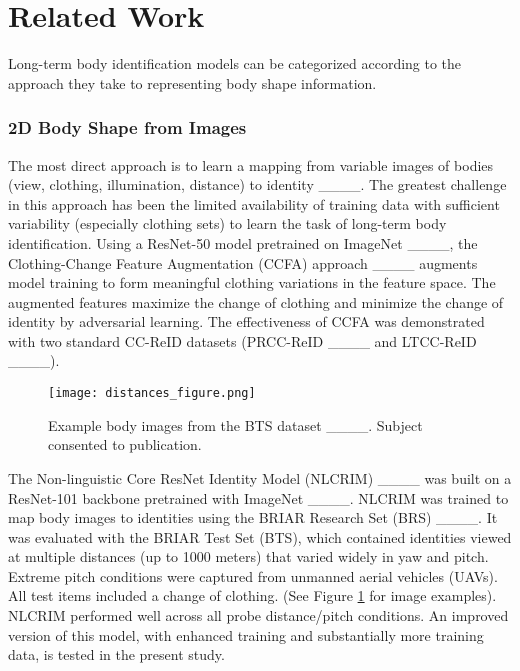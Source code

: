 \section{Related Work}
Long-term body identification models  can be categorized according to the approach they take 
to representing body shape information.

\subsubsection{2D Body Shape from Images}
The most direct approach is to learn
a mapping from variable images of bodies
(view, clothing, illumination, distance) to identity
____.
The greatest challenge in this approach has been
the limited availability of training data with sufficient
variability (especially clothing sets) to learn the task
of long-term body identification.
Using a ResNet-50 model pretrained on ImageNet ____, the Clothing-Change Feature Augmentation (CCFA) approach  ____ augments
model training to form meaningful clothing variations in the feature
space. The augmented features maximize
the change of clothing and minimize the change of identity
by adversarial learning.
The effectiveness of CCFA was demonstrated with 
two standard CC-ReID datasets (PRCC-ReID ____ and  LTCC-ReID ____).

   \begin{figure}[thpb]
      \centering
      \texttt{[image: distances\_figure.png]}
      \caption{Example body images from the BTS dataset ____. Subject consented to publication. }
      \label{BRIAR_images}
      \vskip -0.25cm
   \end{figure}

 The Non-linguistic Core ResNet Identity Model (NLCRIM) ____ was built on a ResNet-101 backbone pretrained with ImageNet ____.  NLCRIM was 
trained to map body images to identities using the BRIAR Research Set (BRS) 
 ____. It was  
evaluated with the BRIAR Test Set (BTS), which contained
identities viewed at multiple distances (up to 1000 meters)
that varied widely in yaw and pitch. Extreme pitch conditions
were captured from unmanned aerial vehicles (UAVs). All
test items included a change of clothing.
(See Figure \ref{BRIAR_images} for image examples). 
NLCRIM performed well
across all probe distance/pitch conditions. 
An improved version
of this model, with enhanced training 
and  substantially more training data, is tested in the present
study.

